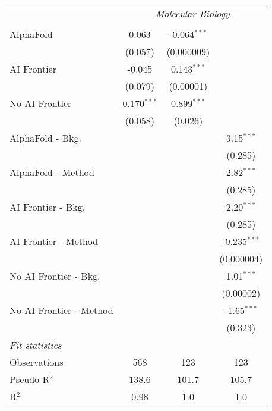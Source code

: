 \begin{tabular}{lccc}
 & \multicolumn{3}{c}{\textit{Molecular Biology}} \\ \\
   AlphaFold               & 0.063         & -0.064$^{***}$ &   \\   
                           & (0.057)       & (0.000009)     &   \\   
   AI Frontier             & -0.045        & 0.143$^{***}$  &   \\   
                           & (0.079)       & (0.00001)      &   \\   
   No AI Frontier          & 0.170$^{***}$ & 0.899$^{***}$  &   \\   
                           & (0.058)       & (0.026)        &   \\   
   AlphaFold - Bkg.        &               &                & 3.15$^{***}$\\   
                           &               &                & (0.285)\\   
   AlphaFold - Method      &               &                & 2.82$^{***}$\\   
                           &               &                & (0.285)\\   
   AI Frontier - Bkg.      &               &                & 2.20$^{***}$\\   
                           &               &                & (0.285)\\   
   AI Frontier - Method    &               &                & -0.235$^{***}$\\   
                           &               &                & (0.000004)\\   
   No AI Frontier - Bkg.   &               &                & 1.01$^{***}$\\   
                           &               &                & (0.00002)\\   
   No AI Frontier - Method &               &                & -1.65$^{***}$\\   
                           &               &                & (0.323)\\   
   \midrule
   \emph{Fit statistics}\\
   Observations            & 568           & 123            & 123\\  
   Pseudo R$^2$            & 138.6         & 101.7          & 105.7\\  
   R$^2$                   & 0.98          & 1.0            & 1.0\\  
   

\end{tabular}
